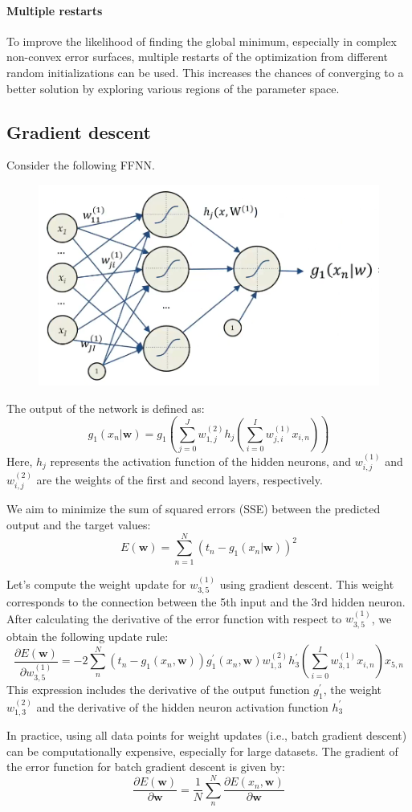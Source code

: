 \paragraph*{Multiple restarts}
To improve the likelihood of finding the global minimum, especially in complex non-convex error surfaces, multiple restarts of the optimization from different random initializations can be used. 
This increases the chances of converging to a better solution by exploring various regions of the parameter space.

\subsection{Gradient descent}
\begin{example}
    Consider the following FFNN. 
    \begin{figure}[H]
        \centering
        \includegraphics[width=0.75\linewidth]{images/ffnn1.png}
    \end{figure}
    The output of the network is defined as:
    \[g_1(x_n|\mathbf{w})=g_1\left(\sum_{j=0}^Jw_{1,j}^{(2)}h_j\left(\sum_{i=0}^Iw_{j,i}^{(1)}x_{i,n}\right)\right)\]
    Here, $h_j$ represents the activation function of the hidden neurons, and $w_{i,j}^{(1)}$ and $w_{i,j}^{(2)}$ are the weights of the first and second layers, respectively.

    We aim to minimize the sum of squared errors (SSE) between the predicted output and the target values:
    \[E(\mathbf{w})=\sum_{n=1}^N\left(t_n-g_1(x_n|\mathbf{w})\right)^2\]

    Let's compute the weight update for $w_{3,5}^{(1)}$ using gradient descent. 
    This weight corresponds to the connection between the 5th input and the 3rd hidden neuron.
    After calculating the derivative of the error function with respect to $w_{3,5}^{(1)}$, we obtain the following update rule: 
    \[\dfrac{\partial E(\mathbf{w})}{\partial w_{3,5}^{(1)}}=-2\sum_n^N(t_n-g_1(x_n,\mathbf{w}))g_1^\prime(x_n,\mathbf{w})w_{1,3}^{(2)}h^\prime_3\left(\sum_{i=0}^Iw_{3,1}^{(1)}x_{i,n}\right)x_{5,n}\]
    This expression includes the derivative of the output function $g^\prime_1$, the weight $w_{1,3}^{(2)}$ and the derivative of the hidden neuron activation function $h^\prime_3$
\end{example}
In practice, using all data points for weight updates (i.e., batch gradient descent) can be computationally expensive, especially for large datasets. 
The gradient of the error function for batch gradient descent is given by:
\[\dfrac{\partial E(\mathbf{w})}{\partial \mathbf{w}}=\dfrac{1}{N}\sum_n^N\dfrac{\partial E(x_n,\mathbf{w})}{\partial\mathbf{w}}\]

